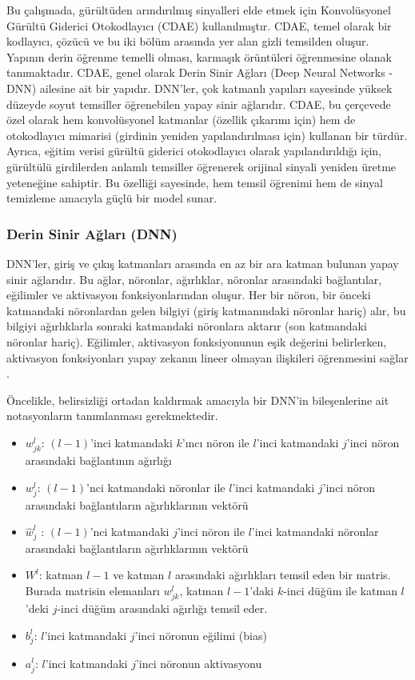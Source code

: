 Bu çalışmada, gürültüden arındırılmış sinyalleri elde etmek için Konvolüsyonel Gürültü Giderici Otokodlayıcı (CDAE) kullanılmıştır. CDAE, temel olarak bir kodlayıcı, çözücü ve bu iki bölüm arasında yer alan gizli temsilden oluşur. Yapının derin öğrenme temelli olması, karmaşık örüntüleri öğrenmesine olanak tanımaktadır. CDAE, genel olarak Derin Sinir Ağları (Deep Neural Networks - DNN) ailesine ait bir yapıdır. DNN'ler, çok katmanlı yapıları sayesinde yüksek düzeyde soyut temsiller öğrenebilen yapay sinir ağlarıdır. CDAE, bu çerçevede özel olarak hem konvolüsyonel katmanlar (özellik çıkarımı için) hem de otokodlayıcı mimarisi (girdinin yeniden yapılandırılması için) kullanan bir türdür. Ayrıca, eğitim verisi gürültü giderici otokodlayıcı olarak yapılandırıldığı için, gürültülü girdilerden anlamlı temsiller öğrenerek orijinal sinyali yeniden üretme yeteneğine sahiptir. Bu özelliği sayesinde, hem temsil öğrenimi hem de sinyal temizleme amacıyla güçlü bir model sunar.


\subsubsection{Derin Sinir Ağları (DNN)}

DNN'ler, giriş ve çıkış katmanları arasında en az bir ara katman bulunan yapay sinir ağlarıdır. Bu ağlar, nöronlar, ağırlıklar, nöronlar arasındaki bağlantılar, eğilimler ve aktivasyon fonksiyonlarından oluşur. Her bir nöron, bir önceki katmandaki nöronlardan gelen bilgiyi (giriş katmanındaki nöronlar hariç) alır, bu bilgiyi ağırlıklarla sonraki katmandaki nöronlara aktarır (son katmandaki nöronlar hariç). Eğilimler, aktivasyon fonksiyonunun eşik değerini belirlerken, aktivasyon fonksiyonları yapay zekanın lineer olmayan ilişkileri öğrenmesini sağlar \cite{nielsen2015neural}.

Öncelikle, belirsizliği ortadan kaldırmak amacıyla bir DNN'in bileşenlerine ait notasyonların tanımlanması gerekmektedir.

\begin{itemize}
    \item $w^l_{jk}$: $(l-1)$'inci katmandaki $k$'ıncı nöron ile $l$'inci katmandaki $j$'inci nöron arasındaki bağlantının ağırlığı
    \item $w^l_j$: $(l-1)$'nci katmandaki nöronlar ile $l$'inci katmandaki $j$'inci nöron arasındaki bağlantıların ağırlıklarının vektörü
    \item $\hat{w}^l_j$ : $(l-1)$'nci katmandaki $j$'inci nöron ile $l$'inci katmandaki nöronlar arasındaki bağlantıların ağırlıklarının vektörü
    \item \( W^{l}\): katman \( l-1 \) ve katman \( l \) arasındaki ağırlıkları temsil eden bir matris. Burada matrisin elemanları \( w_{jk}^{l} \), katman \( l-1 \)'daki \( k \)-inci düğüm ile katman \( l \)'deki \( j \)-inci düğüm arasındaki ağırlığı temsil eder.
    \item $b^l_j$: $l$'inci katmandaki $j$'inci nöronun eğilimi (bias)
    \item $a^l_j$: $l$'inci katmandaki $j$'inci nöronun aktivasyonu
\end{itemize}


